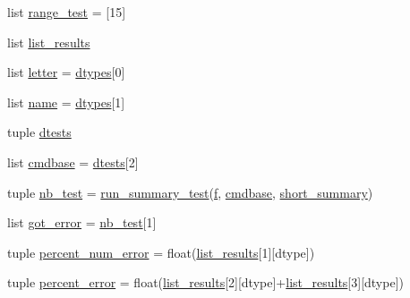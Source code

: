 \begin{DoxyCompactItemize}
list \hyperlink{namespacelapack__testing_a4e59263d773efa6e67bcc26640ead718}{range\+\_\+test} = \mbox{[}15\mbox{]}
\item 
list \hyperlink{namespacelapack__testing_aad1e68d42e2240bfeccb55b8d60e9126}{list\+\_\+results}
\item 
list \hyperlink{namespacelapack__testing_a308432f3e36aa01579924497617f2c4e}{letter} = \hyperlink{namespacelapack__testing_a38154b83ac1c2b82c82b8281944aa66e}{dtypes}\mbox{[}0\mbox{]}
\item 
list \hyperlink{namespacelapack__testing_ad7e315e0bd725f8cac7659735bb3e7f0}{name} = \hyperlink{namespacelapack__testing_a38154b83ac1c2b82c82b8281944aa66e}{dtypes}\mbox{[}1\mbox{]}
\item 
tuple \hyperlink{namespacelapack__testing_af43b367bf5e56b4e2c5875a70c4ec379}{dtests}
\item 
list \hyperlink{namespacelapack__testing_ae99158bf58cf0c0fa2cfac3613274ffc}{cmdbase} = \hyperlink{namespacelapack__testing_af43b367bf5e56b4e2c5875a70c4ec379}{dtests}\mbox{[}2\mbox{]}
\item 
tuple \hyperlink{namespacelapack__testing_aad881dcf1f0a6c09253c6542e03c4eba}{nb\+\_\+test} = \hyperlink{namespacelapack__testing_a4760940b3874f918b5db7fb30d11bee1}{run\+\_\+summary\+\_\+test}(\hyperlink{namespacelapack__testing_a1253c46dadde4ab0f214f59fda7810bb}{f}, \hyperlink{namespacelapack__testing_ae99158bf58cf0c0fa2cfac3613274ffc}{cmdbase}, \hyperlink{namespacelapack__testing_a5a7ce41a3e701dcdb16b4d9855284cb9}{short\+\_\+summary})
\item 
list \hyperlink{namespacelapack__testing_a4923c7b5aecf9d46dcb4675addd06912}{got\+\_\+error} = \hyperlink{namespacelapack__testing_aad881dcf1f0a6c09253c6542e03c4eba}{nb\+\_\+test}\mbox{[}1\mbox{]}
\item 
tuple \hyperlink{namespacelapack__testing_a285006456d0680d9855bef59e84672fe}{percent\+\_\+num\+\_\+error} = float(\hyperlink{namespacelapack__testing_aad1e68d42e2240bfeccb55b8d60e9126}{list\+\_\+results}\mbox{[}1\mbox{]}\mbox{[}dtype\mbox{]})
\item 
tuple \hyperlink{namespacelapack__testing_aac199e91bde8f5bcce6e8f16b5f02406}{percent\+\_\+error} = float(\hyperlink{namespacelapack__testing_aad1e68d42e2240bfeccb55b8d60e9126}{list\+\_\+results}\mbox{[}2\mbox{]}\mbox{[}dtype\mbox{]}+\hyperlink{namespacelapack__testing_aad1e68d42e2240bfeccb55b8d60e9126}{list\+\_\+results}\mbox{[}3\mbox{]}\mbox{[}dtype\mbox{]})
\end{DoxyCompactItemize}


